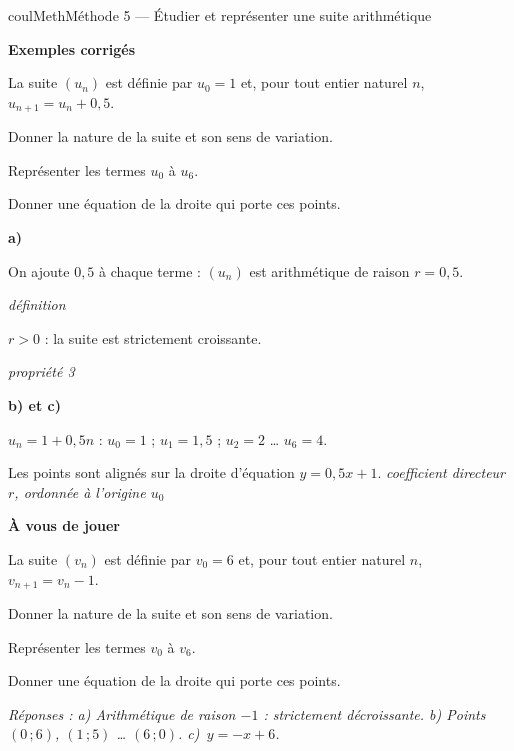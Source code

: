 \documentclass[11pt,a4paper]{article}
\makeatletter
\newcommand{\lycee@gradx}[1]{\foreach \k/\l in {#1}{%
  \draw (\k,0.07)--(\k,-0.07) node[below,font=\scriptsize,inner sep=1.5pt]{$\l$};}}
\newcommand{\lycee@grady}[1]{\foreach \k/\l in {#1}{%
  \draw (0.07,\k)--(-0.07,\k) node[left,font=\scriptsize,inner sep=1.5pt]{$\l$};}}
\providecommand{\gradx}{\lycee@gradx}%
\providecommand{\grady}{\lycee@grady}%
\newcounter{lycee@signet}
\newcommand{\signet}[3][]{\stepcounter{lycee@signet}%
  \edef\lycee@dest{\if\relax\detokenize{#1}\relax
    signet.\arabic{lycee@signet}\else#1\fi}%
  \hypertarget{\lycee@dest}{}\bookmark[level=#2,dest=\lycee@dest]{#3}}
\newcommand{\res}[1]{#1}
\newcounter{methode}
\newenvironment{methodebox}[1][Méthode]{\stepcounter{methode}%
  \begin{boitecours}[phantom={\signet[methode-\arabic{methode}]{2}{#1}}]{coulMeth}{#1}}%
  {\end{boitecours}}
\newcommand{\etape}[1]{\par\smallskip\textbf{\color{coulMeth}#1}\par\nobreak\smallskip}
\newcommand{\reponse}[1]{\par\smallskip
  {\footnotesize\itshape\color{black!55}Réponses : #1}}
\newcommand{\explique}[2]{\par\smallskip\noindent
  \begin{minipage}[t]{0.57\linewidth}\raggedright #1\end{minipage}\hfill
  \begin{minipage}[t]{0.40\linewidth}\raggedright\leavevmode
    {\small\itshape\color{black!60}#2}\end{minipage}\par}
\newcommand{\cas}[1]{\par\smallskip\noindent\textbf{\color{coulExo}#1}\vadjust{\nobreak}}
\newenvironment{correction}{\par}{\par}
\newcommand{\etapeexemples}{\etape{Exemples corrigés}}
\makeatother
\begin{document}
\begin{methodebox}[Méthode 5 --- Étudier et représenter une suite arithmétique]
\etapeexemples
La suite $(u_{n})$ est définie par $u_{0}=1$ et, pour tout entier naturel $n$,
$u_{n+1}=u_{n}+0{,}5$.
\begin{questions}[label=\alph*)]
  \item Donner la nature de la suite et son sens de variation.
  \item Représenter les termes $u_{0}$ à $u_{6}$.
  \item Donner une équation de la droite qui porte ces points.
\end{questions}
\begin{correction}
\cas{a)}
\explique{On ajoute $0{,}5$ à chaque terme : $(u_{n})$ est \res{arithmétique} de raison
$r=\res{0{,}5}$.}{définition}
\explique{$r>0$ : la suite est \res{strictement croissante}.}{propriété 3}
\cas{b) et c)}\par\nopagebreak
\begin{minipage}[c]{0.58\linewidth}\raggedright
$u_{n}=1+0{,}5n$ : $u_{0}=1$ ;\; $u_{1}=1{,}5$ ;\; $u_{2}=2$ \dots\; $u_{6}=4$.

\smallskip
Les points sont alignés sur la droite d'équation $y=\res{0{,}5x+1}$.
{\small\itshape\color{black!60}coefficient directeur $r$, ordonnée à l'origine $u_{0}$}
\end{minipage}\hfill
\begin{minipage}[c]{0.38\linewidth}\centering
{}
\end{minipage}
\end{correction}

\etape{À vous de jouer}
La suite $(v_{n})$ est définie par $v_{0}=6$ et, pour tout entier naturel $n$,
$v_{n+1}=v_{n}-1$.
\begin{questions}[label=\alph*)]
  \item Donner la nature de la suite et son sens de variation.
  \item Représenter les termes $v_{0}$ à $v_{6}$.
  \item Donner une équation de la droite qui porte ces points.
\end{questions}
\reponse{a) Arithmétique de raison $-1$ : strictement décroissante.\; b) Points
$(0\,;6)$, $(1\,;5)$ \dots\; $(6\,;0)$.\; c)~$y=-x+6$.}
\end{methodebox}
\end{document}

